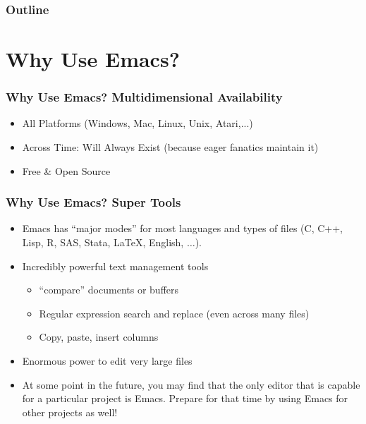 \documentclass[11pt,english]{beamer}
\newcommand\makebeamertitle{\frame{\maketitle}}
\begin{document}

%


\date[2015]{2015}

\makebeamertitle


\begin{frame} 
\frametitle{Outline}

\tableofcontents{}

\end{frame}

\section{Why Use Emacs?}

\begin{frame}
  \frametitle{Why Use Emacs? Multidimensional Availability}
  \begin{itemize}
  \item All Platforms (Windows, Mac, Linux, Unix, Atari,...)
  \item Across Time: Will Always Exist (because eager fanatics maintain it)
  \item Free \& Open Source
  \end{itemize}
\end{frame}

\begin{frame}
  \frametitle{Why Use Emacs? Super Tools}
  \begin{itemize}
  \item Emacs has ``major modes'' for most languages and types of files
    (C, C++, Lisp, R, SAS, Stata, \LaTeX{}, English, $\ldots$). 
  \item Incredibly powerful text management tools

    \begin{itemize}
    \item ``compare'' documents or buffers
    \item Regular expression search and replace (even across many files)
    \item Copy, paste, insert columns
    \end{itemize}
  \item Enormous power to edit very large files
  \item At some point in the future, you may find that the only editor
    that is capable for a particular project is Emacs. Prepare for
    that time by using Emacs for other projects as well! 
  \end{itemize}
\end{frame}
\end{document}
